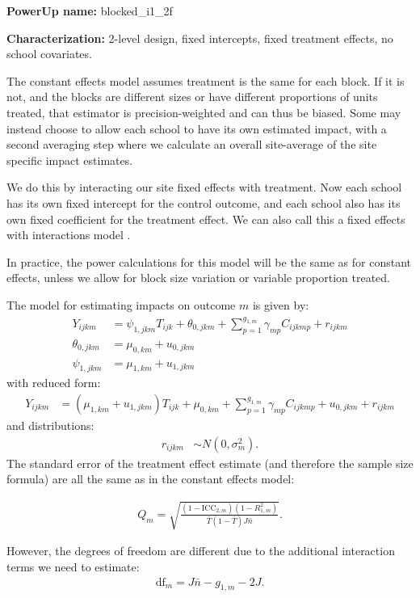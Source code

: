 \documentclass[12pt]{article}
\begin{document}
\textbf{PowerUp name:} blocked\_i1\_2f

\textbf{Characterization:} 2-level design, fixed intercepts, fixed treatment effects, no school covariates.

The constant effects model assumes treatment is the same for each block.
If it is not, and the blocks are different sizes or have different proportions of units treated, that estimator is precision-weighted and can thus be biased.
Some may instead choose to allow each school to have its own estimated impact, with a second averaging step where we calculate an overall site-average of the site specific impact estimates.

We do this by interacting our site fixed effects with treatment.
Now each school has its own fixed intercept for the control outcome, and each school also has its own fixed coefficient for the treatment effect.
We can also call this a fixed effects with interactions model \citep{Miratrix2020}.

In practice, the power calculations for this model will be the same as for constant effects, unless we allow for block size variation or variable proportion treated.

The model for estimating impacts on outcome $m$ is given by:
\begin{align}
Y_{ijkm} &= \psi_{1,jkm} T_{ijk} + \theta_{0,jkm} + \sum_{p=1}^{g_{1,m}} \gamma_{mp} C_{ijkmp} + r_{ijkm}\\
\nonumber \theta_{0,jkm} &= \mu_{0,km} + u_{0,jkm}\\
\nonumber \psi_{1,jkm} &= \mu_{1,km} + u_{1,jkm}
\end{align}
with reduced form:
\begin{align}
Y_{ijkm} &= \left(\mu_{1,km} + u_{1,jkm}\right) T_{ijk} + \mu_{0,km} + \sum_{p=1}^{g_{1,m}} \gamma_{mp} C_{ijkmp} + u_{0,jkm} + r_{ijkm}
\end{align}
and distributions:
\begin{align}
r_{ijkm} &\sim N\left(0, \sigma^2_m\right).
\end{align}
The standard error of the treatment effect estimate (and therefore the sample size formula) are all the same as in the constant effects model:

\begin{align} Q_m = \sqrt{\frac{(1-\text{ICC}_{2,m})(1-R^2_{1,m})}{\bar{T}(1 - \bar{T}) J \bar{n}}} . \end{align}

However, the degrees of freedom are different due to the additional interaction terms we need to estimate:
\begin{align}\text{df}_m = J \bar{n} - g_{1,m} - 2J.\end{align}
\end{document}
